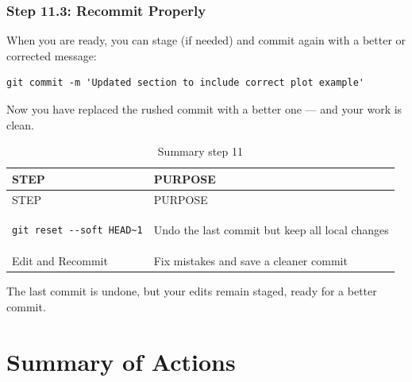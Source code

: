 \documentclass[
  11pt,
  a4paper,
]{article}
\begin{document}
\subsubsection{Step 11.3: Recommit
Properly}\label{step-11.3-recommit-properly}

When you are ready, you can stage (if needed) and commit again with a
better or corrected message:

\begin{verbatim}
git commit -m 'Updated section to include correct plot example'
\end{verbatim}

Now you have replaced the rushed commit with a better one --- and your
work is clean.

\begin{longtable}[]{@{}
  >{\raggedright\arraybackslash}p{}
  >{\raggedright\arraybackslash}p{}@{}}
\caption{Summary step 11}\tabularnewline
\toprule\noalign{}
\begin{minipage}[b]{\linewidth}\raggedright
STEP
\end{minipage} & \begin{minipage}[b]{\linewidth}\raggedright
PURPOSE
\end{minipage} \\
\midrule\noalign{}
\endfirsthead
\toprule\noalign{}
\begin{minipage}[b]{\linewidth}\raggedright
STEP
\end{minipage} & \begin{minipage}[b]{\linewidth}\raggedright
PURPOSE
\end{minipage} \\
\midrule\noalign{}
\endhead
\bottomrule\noalign{}
\endlastfoot
\begin{minipage}[t]{\linewidth}\raggedright
\begin{verbatim}
git reset --soft HEAD~1
\end{verbatim}
\end{minipage} & Undo the last commit but keep all local changes \\
Edit and Recommit & Fix mistakes and save a cleaner commit \\
\end{longtable}

The last commit is undone, but your edits remain staged, ready for a
better commit. \newpage

\section{Summary of Actions}\label{summary-of-actions}
\end{document}
